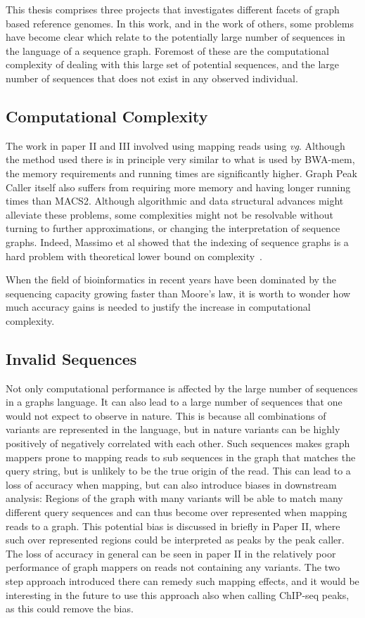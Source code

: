 This thesis comprises three projects that investigates different facets of graph based reference genomes.
In this work, and in the work of others, some problems have become clear which relate to the potentially large number of sequences in the language of a sequence graph. Foremost of these are the computational complexity of dealing with this large set of potential sequences, and the large number of sequences that does not exist in any observed individual.

\subsection{Computational Complexity}
The work in paper II and III involved using mapping reads using \emph{vg}.
Although the method used there is in principle very similar to what is used by BWA-mem, the memory requirements and running times are significantly higher.
Graph Peak Caller itself also suffers from requiring more memory and having longer running times than MACS2. 
Although algorithmic and data structural advances might alleviate these problems, some complexities might not be resolvable without turning to further approximations, or changing the interpretation of sequence graphs.
Indeed, Massimo et al showed that the indexing of sequence graphs is a hard problem with theoretical lower bound on complexity~\cite{indexcomplexity}.

When the field of bioinformatics in recent years have been dominated by the sequencing capacity growing faster than Moore's law, it is worth to wonder how much accuracy gains is needed to justify the increase in computational complexity.

\subsection{Invalid Sequences}
Not only computational performance is affected by the large number of sequences in a graphs language.
It can also lead to a large number of sequences that one would not expect to observe in nature.
This is because all combinations of variants are represented in the language, but in nature variants can be highly positively of negatively correlated with each other.
Such sequences makes graph mappers prone to mapping reads to sub sequences in the graph that matches the query string, but is unlikely to be the true origin of the read.
This can lead to a loss of accuracy when mapping, but can also introduce biases in downstream analysis: Regions of the graph with many variants will be able to match many different query sequences and can thus become over represented when mapping reads to a graph.
This potential bias is discussed in briefly in Paper II, where such over represented regions could be interpreted as peaks by the peak caller.
The loss of accuracy in general can be seen in paper II in the relatively poor performance of graph mappers on reads not containing any variants.
The two step approach introduced there can remedy such mapping effects, and it would be interesting in the future to use this approach also when calling ChIP-seq peaks, as this could remove the bias. 

